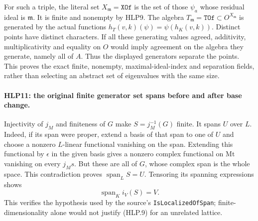 For such a triple, the literal set \(X_{\mathfrak m}=\texttt{XOf}\)
is the set of those \(\psi_a\) whose residual ideal is
\(\mathfrak m\). It is finite and nonempty by HLP9. The algebra
\(T_{\mathfrak m}=\texttt{TOf}\subset O^{X_{\mathfrak m}}\) is
 generated by the actual functions
\(h_T(v,k)(\psi)=\psi(h_K(v,k))\). Distinct points have distinct
characters. If all these generating values agreed, additivity,
multiplicativity and equality on \(O\) would imply agreement on
the algebra they generate, namely all of \(A\). Thus the displayed
generators separate the points. This proves the exact finite,
nonempty, maximal-ideal-index and separation fields, rather than
selecting an abstract set of eigenvalues with the same size.

\paragraph{HLP11: the original finite generator set spans before and after base change.}
\label{claim:HLP11}
Injectivity of \(j_M\) and finiteness of \(G\) make
\(S=j_M^{-1}(G)\) finite. It spans \(U\) over \(L\). Indeed, if
its span were proper, extend a basis of that span to one of \(U\)
and choose a nonzero \(L\)-linear functional vanishing on the
span. Extending this functional by \(\epsilon\) in the given
basis gives a nonzero complex functional on \(\mathrm{Mt}\)
vanishing on every \(j_Ms\). But these are all of \(G\), whose
complex span is the whole space. This contradiction proves
\(\operatorname{span}_LS=U\). Tensoring its spanning expressions
shows
\[
                   \operatorname{span}_K i_V(S)=V.    \tag{HLP.9}
\]
This verifies the hypothesis used by the source's
\texttt{Is\allowbreak Localized\allowbreak Of\allowbreak Span}; finite-dimensionality alone would
not justify (HLP.9) for an unrelated lattice.

